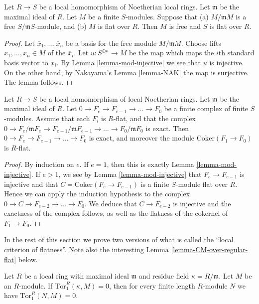 \begin{lemma}
\label{lemma-free-fibre-flat-free}
Let $R \to S$ be a local homomorphism of Noetherian
local rings. Let $\mathfrak m$ be the maximal
ideal of $R$. Let $M$ be a finite $S$-modules.
Suppose that (a) $M/\mathfrak mM$
is a free $S/\mathfrak mS$-module, and (b) $M$ is flat over $R$.
Then $M$ is free and $S$ is flat over $R$.
\end{lemma}

\begin{proof}
Let $\overline{x}_1, \ldots, \overline{x}_n$ be a basis
for the free module $M/\mathfrak mM$. Choose lifts
$x_1, \ldots, x_n \in M$ of the $\overline{x}_i$. Let
$u : S^{\oplus n} \to M$ be the map which maps the $i$th
standard basis vector to $x_i$. By Lemma \ref{lemma-mod-injective}
we see that $u$ is injective. On the other hand, by
Nakayama's Lemma \ref{lemma-NAK} the map is surjective. The
lemma follows.
\end{proof}

\begin{lemma}
\label{lemma-complex-exact-mod}
Let $R \to S$ be a local homomorphism of local Noetherian
rings. Let $\mathfrak m$ be the maximal ideal of $R$.
Let $0 \to F_e \to F_{e-1} \to \ldots \to F_0$
be a finite complex of finite $S$-modules. Assume that
each $F_i$ is $R$-flat, and that the complex
$0 \to F_e/\mathfrak m F_e \to F_{e-1}/\mathfrak m F_{e-1}
\to \ldots \to F_0 / \mathfrak m F_0$ is exact.
Then $0 \to F_e \to F_{e-1} \to \ldots \to F_0$
is exact, and moreover the module
$\text{Coker}(F_1 \to F_0)$ is $R$-flat.
\end{lemma}

\begin{proof}
By induction on $e$. If $e = 1$, then this is exactly
Lemma \ref{lemma-mod-injective}. If $e > 1$, we see
by Lemma \ref{lemma-mod-injective} that $F_e \to F_{e-1}$
is injective and that $C = \text{Coker}(F_e \to F_{e-1})$
is a finite $S$-module flat over $R$. Hence we can
apply the induction hypothesis to the complex
$0 \to C \to F_{e-2} \to \ldots \to F_0$.
We deduce that $C \to F_{e-2}$ is injective
and the exactness of the complex follows, as well
as the flatness of the cokernel of $F_1 \to F_0$.
\end{proof}

\noindent
In the rest of this section we prove two versions of what is called the
``local criterion of flatness''. Note also the interesting
Lemma \ref{lemma-CM-over-regular-flat} below.

\begin{lemma}
\label{lemma-prepare-local-criterion-flatness}
Let $R$ be a local ring with maximal ideal $\mathfrak m$
and residue field $\kappa = R/\mathfrak m$.
Let $M$ be an $R$-module. If $\text{Tor}_1^R(\kappa, M) = 0$,
then for every finite length $R$-module $N$ we have
$\text{Tor}_1^R(N, M) = 0$.
\end{lemma}

